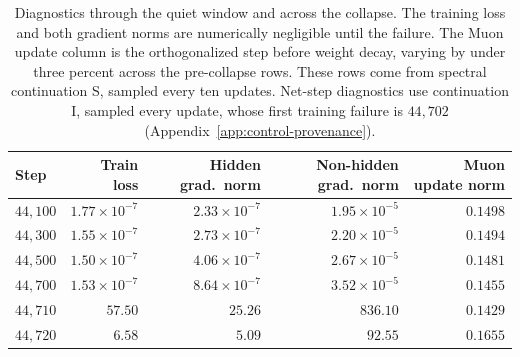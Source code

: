 \begin{table}[t]
\centering\small
\caption{Diagnostics through the quiet window and across the collapse. The training loss
and both gradient norms are numerically negligible until the failure. The Muon update column
is the orthogonalized step before weight decay, varying by under three percent across
the pre-collapse rows. These rows come from spectral continuation S, sampled every ten updates. Net-step diagnostics use continuation I, sampled every update, whose first training failure is $44{,}702$ (Appendix~\ref{app:control-provenance}).}
\label{tab:quiet}
\begin{tabular}{lrrrr}
\toprule
Step & Train loss & Hidden grad.\ norm & Non-hidden grad.\ norm & Muon update norm \\
\midrule
$44{,}100$ & $1.77\times10^{-7}$ & $2.33\times10^{-7}$ & $1.95\times10^{-5}$ & $0.1498$ \\
$44{,}300$ & $1.55\times10^{-7}$ & $2.73\times10^{-7}$ & $2.20\times10^{-5}$ & $0.1494$ \\
$44{,}500$ & $1.50\times10^{-7}$ & $4.06\times10^{-7}$ & $2.67\times10^{-5}$ & $0.1481$ \\
$44{,}700$ & $1.53\times10^{-7}$ & $8.64\times10^{-7}$ & $3.52\times10^{-5}$ & $0.1455$ \\
\midrule
$44{,}710$ & $57.50$ & $25.26$ & $836.10$ & $0.1429$ \\
$44{,}720$ & $6.58$ & $5.09$ & $92.55$ & $0.1655$ \\
\bottomrule
\end{tabular}
\end{table}
